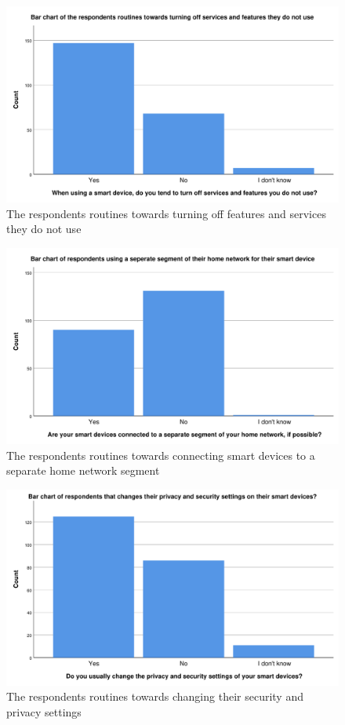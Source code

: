 \begin{figure}[H]
    \centering
    \includegraphics[scale=0.55]{figures/diagrams/turn_off_features.pdf}
    \caption{The respondents routines towards turning off features and services they do not use}
    \label{fig:turn_off_features}
\end{figure}

\begin{figure}[H]
    \centering
    \includegraphics[scale=0.55]{figures/diagrams/separat_segment.pdf}
    \caption{The respondents routines towards connecting smart devices to a separate home network segment}
    \label{fig:separat_segment}
\end{figure}

\begin{figure}[H]
    \centering
    \includegraphics[scale=0.55]{figures/diagrams/settings.pdf}
    \caption{The respondents routines towards changing their security and privacy settings}
    \label{fig:settings}
\end{figure}

